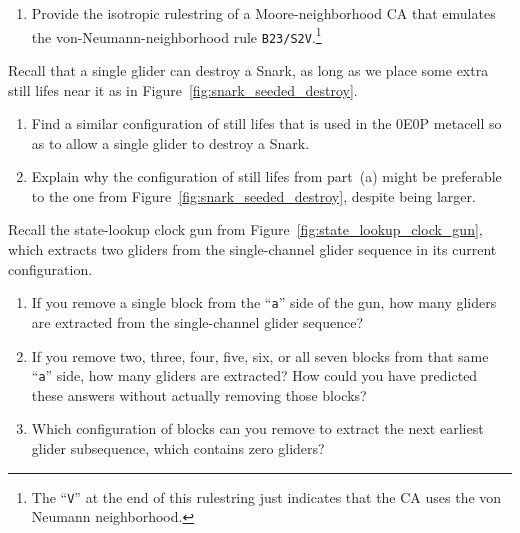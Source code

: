 \begin{multicols}{2}
\begin{problem}
\begin{enumerate}[label=\bf\color{ocre}(\alph*)]
			\item Provide the isotropic rulestring of a Moore-neighborhood CA that emulates the von-Neumann-neighborhood rule \texttt{B23/S2V}.\footnote{The ``\texttt{V}'' at the end of this rulestring just indicates that the CA uses the von Neumann neighborhood.}
		\end{enumerate}
	\end{problem}
	
	
	\mfilbreak
	
	
	\begin{problemstar}\label{exer:0e0p_snark_destroyer} 
		Recall that a single glider can destroy a Snark, as long as we place some extra still lifes near it as in Figure~\ref{fig:snark_seeded_destroy}.\smallskip
		
		\begin{enumerate}[label=\bf\color{ocre}(\alph*)]
			\item Find a similar configuration of still lifes that is used in the 0E0P metacell so as to allow a single glider to destroy a Snark.
			
			\item Explain why the configuration of still lifes from part~(a) might be preferable to the one from Figure~\ref{fig:snark_seeded_destroy}, despite being larger.
		\end{enumerate}
	\end{problemstar}


	\mfilbreak
	
	
	\begin{problem}\label{exer:0e0p_state_lookup_gun}
		Recall the state-lookup clock gun from Figure~\ref{fig:state_lookup_clock_gun}, which extracts two gliders from the single-channel glider sequence in its current configuration.\smallskip
		
		\begin{enumerate}[label=\bf\color{ocre}(\alph*)]
			\item {} If you remove a single block from the ``\texttt{a}'' side of the gun, how many gliders are extracted from the single-channel glider sequence?
			
			\item {} If you remove two, three, four, five, six, or all seven blocks from that same ``\texttt{a}'' side, how many gliders are extracted? How could you have predicted these answers without actually removing those blocks?
			
			\item {} Which configuration of blocks can you remove to extract the next earliest glider subsequence, which contains zero gliders?
			

\end{enumerate}
\end{problem}
\end{multicols}
